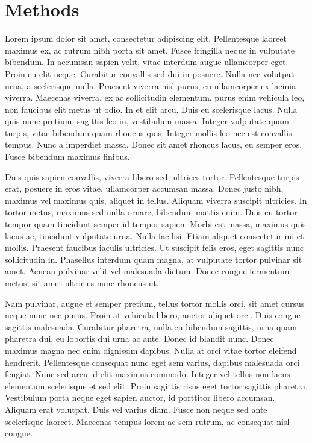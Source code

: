 \section{Methods}

Lorem ipsum dolor sit amet, consectetur adipiscing elit. Pellentesque laoreet maximus ex, ac rutrum nibh porta sit amet. Fusce fringilla neque in vulputate bibendum. In accumsan sapien velit, vitae interdum augue ullamcorper eget. Proin eu elit neque. Curabitur convallis sed dui in posuere. Nulla nec volutpat urna, a scelerisque nulla. Praesent viverra nisl purus, eu ullamcorper ex lacinia viverra. Maecenas viverra, ex ac sollicitudin elementum, purus enim vehicula leo, non faucibus elit metus ut odio. In et elit arcu. Duis eu scelerisque lacus. Nulla quis nunc pretium, sagittis leo in, vestibulum massa. Integer vulputate quam turpis, vitae bibendum quam rhoncus quis. Integer mollis leo nec est convallis tempus. Nunc a imperdiet massa. Donec sit amet rhoncus lacus, eu semper eros. Fusce bibendum maximus finibus.

Duis quis sapien convallis, viverra libero sed, ultrices tortor. Pellentesque turpis erat, posuere in eros vitae, ullamcorper accumsan massa. Donec justo nibh, maximus vel maximus quis, aliquet in tellus. Aliquam viverra suscipit ultricies. In tortor metus, maximus sed nulla ornare, bibendum mattis enim. Duis eu tortor tempor quam tincidunt semper id tempor sapien. Morbi est massa, maximus quis lacus ac, tincidunt vulputate urna. Nulla facilisi. Etiam aliquet consectetur mi et mollis. Praesent faucibus iaculis ultricies. Ut suscipit felis eros, eget sagittis nunc sollicitudin in. Phasellus interdum quam magna, at vulputate tortor pulvinar sit amet. Aenean pulvinar velit vel malesuada dictum. Donec congue fermentum metus, sit amet ultricies nunc rhoncus ut.

Nam pulvinar, augue et semper pretium, tellus tortor mollis orci, sit amet cursus neque nunc nec purus. Proin at vehicula libero, auctor aliquet orci. Duis congue sagittis malesuada. Curabitur pharetra, nulla eu bibendum sagittis, urna quam pharetra dui, eu lobortis dui urna ac ante. Donec id blandit nunc. Donec maximus magna nec enim dignissim dapibus. Nulla at orci vitae tortor eleifend hendrerit. Pellentesque consequat nunc eget sem varius, dapibus malesuada orci feugiat. Nunc sed arcu id elit maximus commodo. Integer vel tellus non lacus elementum scelerisque et sed elit. Proin sagittis risus eget tortor sagittis pharetra. Vestibulum porta neque eget sapien auctor, id porttitor libero accumsan. Aliquam erat volutpat. Duis vel varius diam. Fusce non neque sed ante scelerisque laoreet. Maecenas tempus lorem ac sem rutrum, ac consequat nisl congue.

